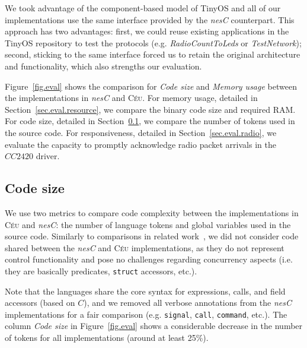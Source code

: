 \documentclass[letterpaper]{sig-alternate}
\newcommand{\code}[1] {{\small{\texttt{#1}}}}
\newcommand{\CEU}{\textsc{C\'{e}u}\xspace}
\begin{document}
%

We took advantage of the component-based model of TinyOS and all of our 
implementations use the same interface provided by the \emph{nesC} counterpart.
This approach has two advantages:
first, we could reuse existing applications in the TinyOS repository to test 
the protocols (e.g. \emph{RadioCountToLeds} or \emph{TestNetwork});
second, sticking to the same interface forced us to retain the original 
architecture and functionality, which also strengths our evaluation.

Figure~\ref{fig.eval} shows the comparison for \emph{Code size} and 
\emph{Memory usage} between the implementations in \emph{nesC} and \CEU.
%
For memory usage, detailed in Section~\ref{sec.eval.resource}, we compare the 
binary code size and required RAM.
%
For code size, detailed in Section~\ref{sec.eval.code}, we compare the number 
of tokens used in the source code.
%
For responsiveness, detailed in Section~\ref{sec.eval.radio}, we evaluate the 
capacity to promptly acknowledge radio packet arrivals in the $CC2420$ driver.

\subsection{Code size}
\label{sec.eval.code}

We use two metrics to compare code complexity between the implementations in 
\CEU and \emph{nesC}: the number of language tokens and global variables used 
in the source code.
%
Similarly to comparisons in related work~\cite{wsn.ocram,wsn.protothreads}, we 
did not consider code shared between the \emph{nesC} and \CEU implementations, 
as they do not represent control functionality and pose no challenges regarding 
concurrency aspects (i.e. they are basically predicates, \code{struct} 
accessors, etc.).

%
Note that the languages share the core syntax for expressions, calls, and field 
accessors (based on $C$), and we removed all verbose annotations from the 
\emph{nesC} implementations for a fair comparison (e.g. \code{signal}, 
\code{call}, \code{command}, etc.).
%
The column \emph{Code size} in Figure~\ref{fig.eval} shows a considerable 
decrease in the number of tokens for all implementations (around at least 
25\%).
\end{document}
